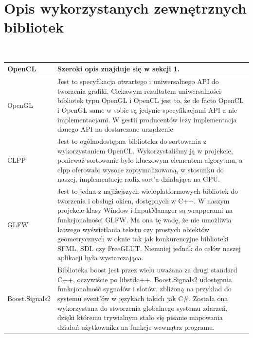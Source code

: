 \documentclass[polish, 12pt]{aghthesis}
\begin{document}
\section{Opis wykorzystanych zewnętrznych bibliotek}
	\ \\
	\begin{tabular}{| p{} | p{} |}
		\hline
			OpenCL & Szeroki opis znajduje się w sekcji 1. \\
		\hline
			OpenGL &  Jest to specyfikacja otwartego i uniwersalnego API do tworzenia grafiki. Ciekawym rezultatem uniwersalności bibliotek typu OpenGL i OpenCL jest to, że de facto OpenCL i OpenGL same w sobie są jedynie specyfikacjami API a nie implementacjami. W gestii producentów leży implementacja danego API na dostarczane urządzenie.\\
		\hline
			CLPP &  Jest to ogólnodostępna biblioteka do sortowania z wykorzystaniem OpenCL. Wykorzystaliśmy ją w projekcie, ponieważ sortowanie było kluczowym elementem algorytmu, a clpp oferowało wysoce zoptymalizowaną, w stosunku do naszej, implementację radix sort'a działająca na GPU.\\
		\hline
			GLFW &  Jest to jedna z najlżejszych wieloplatformowych bibliotek do tworzenia i obsługi okien, dostępnych w C++. W naszym projekcie klasy Window i InputManager są wrapperami na funkcjonalności GLFW. Ma ona tę wadę, że nie umożliwia łatwego wyświetlania tekstu czy prostych obiektów geometrycznych w oknie tak jak konkurencyjne biblioteki SFML, SDL czy FreeGLUT. Niemniej jednak do celów naszej aplikacji była wystarczająca. \\
		\hline
			Boost.Signals2 &  Biblioteka boost jest przez wielu uważana za drugi standard C++, oczywiście po libstdc++. Boost.Signals2 udostępnia funkcjonalność sygnałów i slotów, zbliżoną na przykład do systemu event'ów w językach takich jak C\#. Została ona wykorzystana do stworzenia globalnego systemu zdarzeń, dzięki któremu trywialnym stało się pisanie mapowania działań użytkownika na funkcje wewnątrz programu. \\
		\hline	
	\end{tabular}
	\clearpage
	
	\nocite{OpenCLProgrammingGuide,GameCodingComplete,CLPP,SPHWebinar}
	
	
\end{document}
